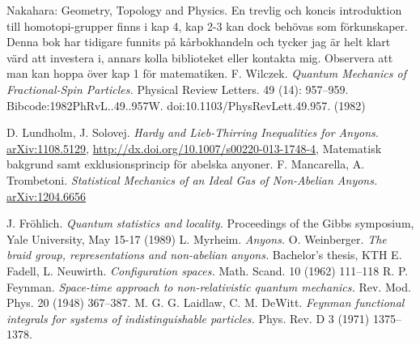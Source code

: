 \documentclass[a4paper,10pt,oneside]{book}
\theoremstyle{plain}
\theoremstyle{definition}
\theoremstyle{remark}
\begin{document}
\begin{thebibliography}{99}



   Nakahara: Geometry, Topology and Physics. En trevlig och koncis introduktion till homotopi-grupper finns i kap 4, kap 2-3 kan dock behövas som förkunskaper. Denna bok har tidigare funnits på kårbokhandeln och tycker jag är helt klart värd att investera i, annars kolla biblioteket eller kontakta mig. Observera att man kan hoppa över kap 1 för matematiken.
   F. Wilczek. \textit{Quantum Mechanics of Fractional-Spin Particles.} Physical Review Letters. 49 (14): 957–959. Bibcode:1982PhRvL..49..957W. doi:10.1103/PhysRevLett.49.957. (1982)

   D. Lundholm, J. Solovej. \textit{Hardy and Lieb-Thirring Inequalities for Anyons.} \href{https://arxiv.org/abs/1108.5129}{arXiv:1108.5129}, \url{http://dx.doi.org/10.1007/s00220-013-1748-4}, Matematisk bakgrund samt exklusionsprincip för abelska anyoner.
   F. Mancarella, A. Trombetoni. \textit{Statistical Mechanics of an Ideal Gas of Non-Abelian Anyons.} \href{https://arxiv.org/abs/1204.6656}{arXiv:1204.6656}

   J. Fröhlich. \textit{Quantum statistics and locality.} Proceedings of the Gibbs symposium, Yale University, May 15-17 (1989)
   L. Myrheim. \textit{Anyons.}
   O. Weinberger. \textit{The braid group, representations and non-abelian anyons.} Bachelor's thesis, KTH
   E. Fadell, L. Neuwirth. \textit{Configuration spaces.} Math. Scand. 10 (1962) 111–118
   R. P. Feynman. \textit{Space-time approach to non-relativistic quantum mechanics.} Rev. Mod. Phys. 20 (1948) 367–387.
   M. G. G. Laidlaw, C. M. DeWitt. \textit{Feynman functional integrals for systems of indistinguishable particles.} Phys. Rev. D 3 (1971) 1375–1378.


\end{thebibliography}
\end{document}
